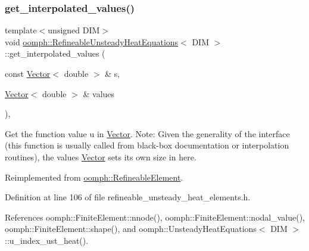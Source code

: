\subsubsection{\texorpdfstring{get\+\_\+interpolated\+\_\+values()}{get\_interpolated\_values()}\hspace{0.1cm}{\footnotesize\ttfamily [1/2]}}
{\footnotesize\ttfamily template$<$unsigned D\+IM$>$ \\
void \hyperlink{classoomph_1_1RefineableUnsteadyHeatEquations}{oomph\+::\+Refineable\+Unsteady\+Heat\+Equations}$<$ D\+IM $>$\+::get\+\_\+interpolated\+\_\+values (\begin{DoxyParamCaption}\item[{const \hyperlink{classoomph_1_1Vector}{Vector}$<$ double $>$ \&}]{s,  }\item[{\hyperlink{classoomph_1_1Vector}{Vector}$<$ double $>$ \&}]{values }\end{DoxyParamCaption})\hspace{0.3cm}{\ttfamily [inline]}, {\ttfamily [virtual]}}



Get the function value u in \hyperlink{classoomph_1_1Vector}{Vector}. Note\+: Given the generality of the interface (this function is usually called from black-\/box documentation or interpolation routines), the values \hyperlink{classoomph_1_1Vector}{Vector} sets its own size in here. 



Reimplemented from \hyperlink{classoomph_1_1RefineableElement_ad9a4f92880668a2373326d8306365c43}{oomph\+::\+Refineable\+Element}.



Definition at line 106 of file refineable\+\_\+unsteady\+\_\+heat\+\_\+elements.\+h.



References oomph\+::\+Finite\+Element\+::nnode(), oomph\+::\+Finite\+Element\+::nodal\+\_\+value(), oomph\+::\+Finite\+Element\+::shape(), and oomph\+::\+Unsteady\+Heat\+Equations$<$ D\+I\+M $>$\+::u\+\_\+index\+\_\+ust\+\_\+heat().

\mbox{\label{classoomph_1_1RefineableUnsteadyHeatEquations_a661820fcf2bd6518717ec8d81649a8d7}} 
